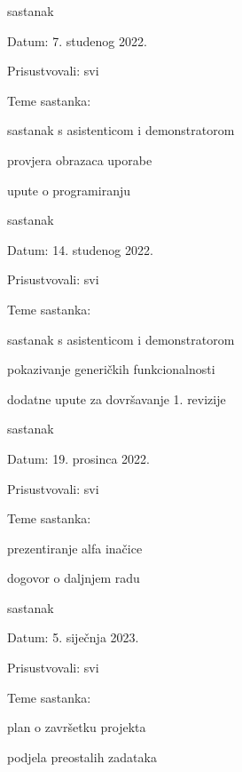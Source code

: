 \begin{packed_enum}
			\item  sastanak
			\item[] \begin{packed_item}
				\item Datum: 7. studenog 2022.
				\item Prisustvovali: svi
				\item Teme sastanka:
				\begin{packed_item}
					\item  sastanak s asistenticom i demonstratorom
					\item  provjera obrazaca uporabe
					\item  upute o programiranju
				\end{packed_item}
			\end{packed_item}
			
			\item  sastanak
			\item[] \begin{packed_item}
				\item Datum: 14. studenog 2022.
				\item Prisustvovali: svi
				\item Teme sastanka:
				\begin{packed_item}
					\item  sastanak s asistenticom i demonstratorom
					\item  pokazivanje generičkih funkcionalnosti
					\item  dodatne upute za dovršavanje 1. revizije
				\end{packed_item}
			\end{packed_item}
		
			\item  sastanak
			\item[] \begin{packed_item}
				\item Datum: 19. prosinca 2022.
				\item Prisustvovali: svi
				\item Teme sastanka:
				\begin{packed_item}
					\item  prezentiranje alfa inačice
					\item  dogovor o daljnjem radu
				\end{packed_item}
			\end{packed_item}
		
			\item  sastanak
			\item[] \begin{packed_item}
				\item Datum: 5. siječnja 2023.
				\item Prisustvovali: svi
				\item Teme sastanka:
				\begin{packed_item}
					\item  plan o završetku projekta
					\item  podjela preostalih zadataka 
				\end{packed_item}
			\end{packed_item}
		

\end{packed_enum}
